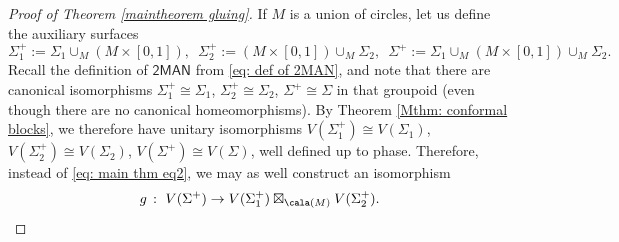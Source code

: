 \documentclass[a4paper,10pt,leqno]{amsart}
\theoremstyle{plain}
\theoremstyle{definition}
\theoremstyle{remark}
\begin{document}
\begin{proof}[Proof of Theorem \ref{maintheorem gluing}]
If $M$ is a union of circles, let us define the auxiliary surfaces
\[
\Sigma_1^+:=\Sigma_1 \cup_M (M\times [0,1]),\,\,\,
\Sigma_2^+:=(M\times [0,1]) \cup_M \Sigma_2,\,\,\,
\Sigma^+:=\Sigma_1 \cup_M (M\times [0,1]) \cup_M \Sigma_2.
\]
Recall the definition of $\mathsf{2MAN}$ from \eqref{eq: def of 2MAN},
and note that there are canonical isomorphisms
$\Sigma_1^+\cong \Sigma_1$, $\Sigma_2^+\cong \Sigma_2$, $\Sigma^+\cong \Sigma$ in that groupoid
(even though there are no canonical homeomorphisms).
By Theorem \ref{Mthm: conformal blocks}, we therefore have unitary isomorphisms
$V(\Sigma_1^+)\cong V(\Sigma_1)$, $V(\Sigma_2^+)\cong V(\Sigma_2)$, $V(\Sigma^+)\cong V(\Sigma)$,
well defined up to phase.
Therefore, instead of \eqref{eq: main thm eq2}, we may as well construct an isomorphism
\begin{equation}\label{eq: the map g}
g\,:\,\,V(\Sigma^+)\to V(\Sigma_1^+)\boxtimes_{\cala(M)} V(\Sigma_2^+).
\end{equation}


\end{proof}
\end{document}
